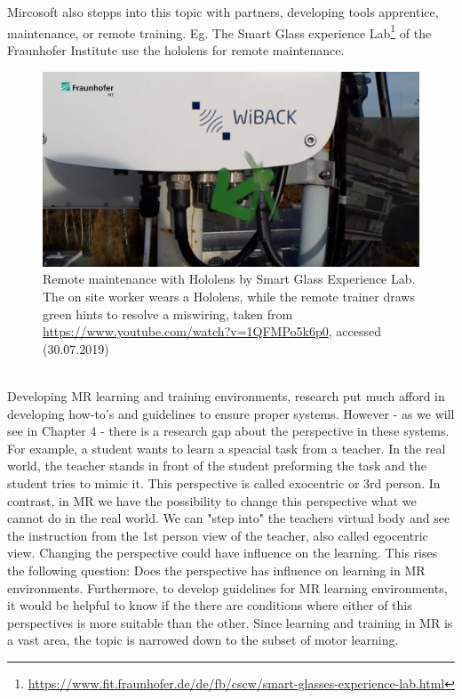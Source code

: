 Mircosoft also stepps into this topic with partners, developing tools apprentice, maintenance, or remote training. Eg. The Smart Glass experience Lab\footnote{\hyperlink{https://www.fit.fraunhofer.de/de/fb/cscw/smart-glasses-experience-lab.html}{https://www.fit.fraunhofer.de/de/fb/cscw/smart-glasses-experience-lab.html}} of the Fraunhofer Institute use the hololens for remote maintenance.
\begin{figure}
	\centering
	\includegraphics[width=1.0\textwidth]{img/fraunhofer.PNG}
	\caption{Remote maintenance with Hololens by Smart Glass Experience Lab. The on site worker wears a Hololens, while the remote trainer draws green hints to resolve a miswiring, taken from \hyperlink{https://www.youtube.com/watch?v=1QFMPo5k6p0}{https://www.youtube.com/watch?v=1QFMPo5k6p0}, accessed (30.07.2019)}
	\label{fig:eonreality}
\end{figure}\\
Developing MR learning and training environments, research put much afford in developing how-to's and guidelines to ensure proper systems. However - as we will see in Chapter 4 - there is a research gap about the perspective in these systems. For example, a student wants to learn a speacial task from a teacher. In the real world, the teacher stands in front of the student preforming the task and the student tries to mimic it. This perspective is called exocentric or 3rd person. In contrast, in MR we have the possibility to change this perspective what we cannot do in the real world. We can "step into" the teachers virtual body and see the instruction from the 1st person view of the teacher, also called egocentric view. Changing the perspective could have influence on the learning. This rises the following question: Does the perspective has influence on learning in MR environments. Furthermore, to develop guidelines for MR learning environments, it would be helpful to know if the there are conditions where either of this perspectives is more suitable than the other. Since learning and training in MR is a vast area, the topic is narrowed down to the subset of motor learning. 
